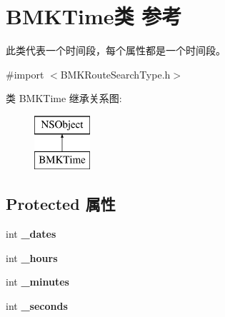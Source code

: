 \hypertarget{interface_b_m_k_time}{\section{B\+M\+K\+Time类 参考}
\label{interface_b_m_k_time}
}


此类代表一个时间段，每个属性都是一个时间段。  




{\ttfamily \#import $<$B\+M\+K\+Route\+Search\+Type.\+h$>$}

类 B\+M\+K\+Time 继承关系图\+:\begin{figure}[H]
\begin{center}
\leavevmode
\includegraphics[height=2.000000cm]{interface_b_m_k_time}
\end{center}
\end{figure}
\subsection*{Protected 属性}
\begin{DoxyCompactItemize}
\item 
\hypertarget{interface_b_m_k_time_af301a1d5456265dd7e7de6e436b60e6f}{int {\bfseries \+\_\+dates}}\label{interface_b_m_k_time_af301a1d5456265dd7e7de6e436b60e6f}

\item 
\hypertarget{interface_b_m_k_time_a94fe70a1661e0d87a62aea5e8410b795}{int {\bfseries \+\_\+hours}}\label{interface_b_m_k_time_a94fe70a1661e0d87a62aea5e8410b795}

\item 
\hypertarget{interface_b_m_k_time_a9e7741ab7eed73e512d8c774e010dfc4}{int {\bfseries \+\_\+minutes}}\label{interface_b_m_k_time_a9e7741ab7eed73e512d8c774e010dfc4}

\item 
\hypertarget{interface_b_m_k_time_a398774b4d57bf197fff42a0503d607c7}{int {\bfseries \+\_\+seconds}}\label{interface_b_m_k_time_a398774b4d57bf197fff42a0503d607c7}

\end{DoxyCompactItemize}
